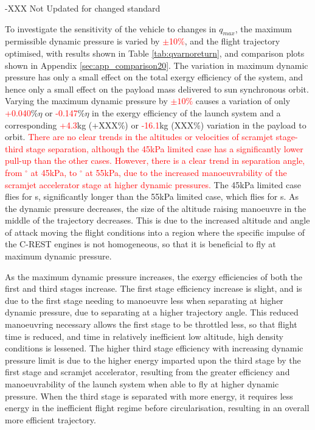 -XXX Not Updated for changed standard


To investigate the sensitivity of the vehicle to changes in $q_{max}$, the maximum permissible dynamic pressure is varied by \textcolor{red}{$\pm$10\%}, and the flight trajectory optimised, with results shown in Table \ref{tab:qvarnoreturn}, and comparison plots shown in Appendix \ref{sec:app_comparison20}.
The variation in maximum dynamic pressure has only a small effect on the total exergy efficiency of the system, and hence only a small effect on the payload mass delivered to sun synchronous orbit.  Varying the maximum dynamic pressure by \textcolor{red}{$\pm10\%$} causes a variation of only \textcolor{red}{+0.040}\%$\eta$ or \textcolor{red}{-0.147}\%$\eta$ in the exergy efficiency of the launch system and a corresponding \textcolor{red}{+4.3}kg (+XXX\%) or \textcolor{red}{-16.1}kg (XXX\%) variation in the payload to orbit.  
\textcolor{red}{There are no clear trends in the altitudes or velocities of scramjet stage-third stage separation, although the 45kPa limited case has a significantly lower pull-up than the other cases. However, there is a clear trend in separation angle, from \secondthirdSeparationgammaqFortyFiveNoReturn $^\circ$ at 45kPa, to \secondthirdSeparationgammaqFiftyFiveNoReturn $^\circ$ at 55kPa, due to the increased manoeuvrability of the scramjet accelerator stage at higher dynamic pressures. }
The 45kPa limited case flies for \secondFlightTimeqFortyFiveNoReturn s, significantly longer than the 55kPa limited case, which flies for \secondFlightTimeqFiftyFiveNoReturn s.
As the dynamic pressure decreases, the size of the altitude raising manoeuvre in the middle of the trajectory decreases. This is due to the increased altitude and angle of attack moving the flight conditions into a region where the specific impulse of the C-REST engines is not homogeneous, so that it is beneficial to fly at maximum dynamic pressure.  

As the maximum dynamic pressure increases, the exergy efficiencies of both the first and third stages increase. The first stage efficiency increase is slight, and is due to the first stage needing to manoeuvre less when separating at higher dynamic pressure, due to separating at a higher trajectory angle. This reduced manoeuvring necessary allows the first stage to be throttled less, so that flight time is reduced, and time in relatively inefficient low altitude, high density conditions is lessened. The higher third stage efficiency with increasing dynamic pressure limit is due to the higher energy imparted upon the third stage by the first stage and scramjet accelerator, resulting from the greater efficiency and manoeuvrability of the launch system when able to fly at higher dynamic pressure. When the third stage is separated with more energy, it requires less energy in the inefficient flight regime before circularisation, resulting in an overall more efficient trajectory. 



